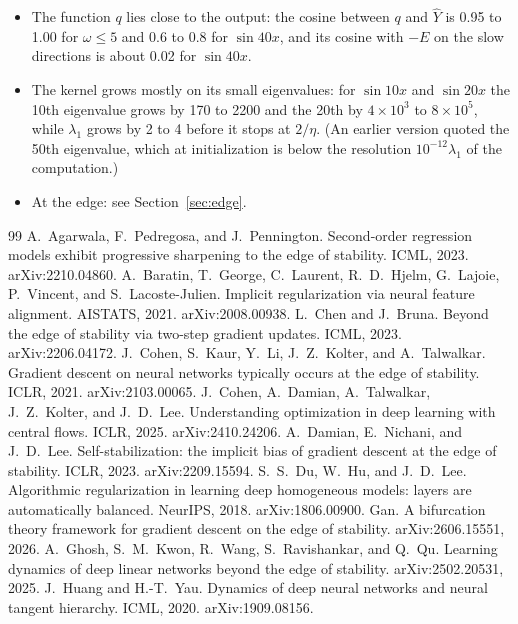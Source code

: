 \documentclass[11pt]{article}
\theoremstyle{definition}
\theoremstyle{remark}
\begin{document}
\begin{itemize}
\item The function $q$ lies close to the output: the cosine between $q$ and $\hat Y$ is 0.95 to 1.00 for $\omega\le5$ and 0.6 to 0.8 for $\sin40x$, and its cosine with $-E$ on the slow directions is about 0.02 for $\sin40x$.
\item The kernel grows mostly on its small eigenvalues: for $\sin10x$ and $\sin20x$ the 10th eigenvalue grows by 170 to 2200 and the 20th by $4\times10^3$ to $8\times10^5$, while $\lambda_1$ grows by 2 to 4 before it stops at $2/\eta$. (An earlier version quoted the 50th eigenvalue, which at initialization is below the resolution $10^{-12}\lambda_1$ of the computation.)
\item At the edge: see Section~\ref{sec:edge}.
\end{itemize}

\begin{thebibliography}{99}
 A.~Agarwala, F.~Pedregosa, and J.~Pennington. Second-order regression models exhibit progressive sharpening to the edge of stability. ICML, 2023. arXiv:2210.04860.
 A.~Baratin, T.~George, C.~Laurent, R.~D.~Hjelm, G.~Lajoie, P.~Vincent, and S.~Lacoste-Julien. Implicit regularization via neural feature alignment. AISTATS, 2021. arXiv:2008.00938.
 L.~Chen and J.~Bruna. Beyond the edge of stability via two-step gradient updates. ICML, 2023. arXiv:2206.04172.
 J.~Cohen, S.~Kaur, Y.~Li, J.~Z.~Kolter, and A.~Talwalkar. Gradient descent on neural networks typically occurs at the edge of stability. ICLR, 2021. arXiv:2103.00065.
 J.~Cohen, A.~Damian, A.~Talwalkar, J.~Z.~Kolter, and J.~D.~Lee. Understanding optimization in deep learning with central flows. ICLR, 2025. arXiv:2410.24206.
 A.~Damian, E.~Nichani, and J.~D.~Lee. Self-stabilization: the implicit bias of gradient descent at the edge of stability. ICLR, 2023. arXiv:2209.15594.
 S.~S.~Du, W.~Hu, and J.~D.~Lee. Algorithmic regularization in learning deep homogeneous models: layers are automatically balanced. NeurIPS, 2018. arXiv:1806.00900.
 Gan. A bifurcation theory framework for gradient descent on the edge of stability. arXiv:2606.15551, 2026.
 A.~Ghosh, S.~M.~Kwon, R.~Wang, S.~Ravishankar, and Q.~Qu. Learning dynamics of deep linear networks beyond the edge of stability. arXiv:2502.20531, 2025.
 J.~Huang and H.-T.~Yau. Dynamics of deep neural networks and neural tangent hierarchy. ICML, 2020. arXiv:1909.08156.

\end{thebibliography}
\end{document}
